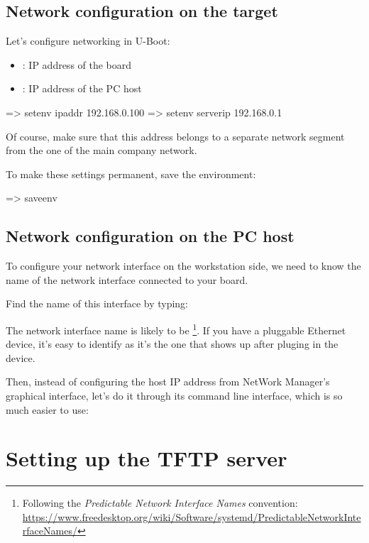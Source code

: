 \subsection{Network configuration on the target}

Let's configure networking in U-Boot:

\begin{itemize}
\item {}: IP address of the board
\item {}: IP address of the PC host
\end{itemize}

\begin{ubootinput}
=> setenv ipaddr 192.168.0.100
=> setenv serverip 192.168.0.1
\end{ubootinput}

Of course, make sure that this address belongs to a separate network
segment from the one of the main company network.

To make these settings permanent, save the environment:

\begin{ubootinput}
=> saveenv
\end{ubootinput}

\subsection{Network configuration on the PC host}

To configure your network interface on the workstation side, we need
to know the name of the network interface connected to your board.

Find the name of this interface by typing:

The network interface name is likely to be
\footnote{Following the {\em Predictable Network Interface
Names} convention:
\url{https://www.freedesktop.org/wiki/Software/systemd/PredictableNetworkInterfaceNames/}}.
If you have a pluggable Ethernet device, it's easy to identify as it's
the one that shows up after pluging in the device.

Then, instead of configuring the host IP address from NetWork Manager's
graphical interface, let's do it through its command line interface,
which is so much easier to use:


\section{Setting up the TFTP server}

